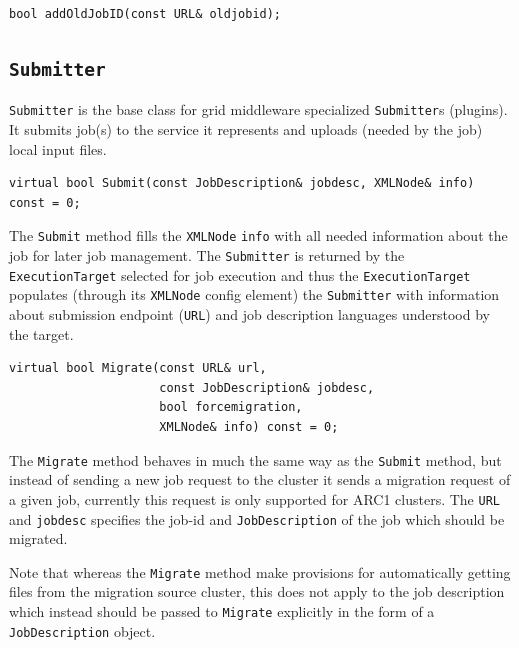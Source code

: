 \documentclass{book}
\newcommand{\ExecutionTarget}{\texttt{ExecutionTarget}}
\newcommand{\JobDescription}{\texttt{JobDescription}}
\newcommand{\Submitter}{\texttt{Submitter}}
\newcommand{\URL}{\texttt{URL}}
\newcommand{\XMLNode}{\texttt{XMLNode}}
\begin{document}
\begin{shaded}
\begin{verbatim}
bool addOldJobID(const URL& oldjobid);
\end{verbatim}
\end{shaded}

\subsection{{\Submitter}}

{\Submitter} is the base class for grid middleware specialized {\Submitter}s (plugins).
It submits job(s) to the service it represents and uploads (needed by the job) local 
input files.

\begin{shaded}
\begin{verbatim}
virtual bool Submit(const JobDescription& jobdesc, XMLNode& info) const = 0;
\end{verbatim}
\end{shaded}

The \texttt{Submit} method fills the {\XMLNode} \texttt{info} with all
needed information about the job for later job management. The
{\Submitter} is returned by the {\ExecutionTarget} selected for job
execution and thus the {\ExecutionTarget} populates (through its
{\XMLNode} config element) the {\Submitter} with information about
submission endpoint ({\URL}) and job description languages understood
by the target.

\begin{shaded}
\begin{verbatim}
virtual bool Migrate(const URL& url,
                     const JobDescription& jobdesc,
                     bool forcemigration,
                     XMLNode& info) const = 0;
\end{verbatim}
\end{shaded}

The \texttt{Migrate} method behaves in much the same way as the \texttt{Submit}
method, but instead of sending a new job request to the cluster it sends a 
migration request of a given job, currently this request is only supported 
for ARC1 clusters. The \texttt{URL} and \texttt{jobdesc} specifies the job-id 
and {\JobDescription} of the job which should be migrated.

Note that whereas the \texttt{Migrate} method make provisions for automatically 
getting files from the migration source cluster, this does not apply to the job 
description which instead should be passed to \texttt{Migrate} explicitly in the 
form of a {\JobDescription} object.
\end{document}
